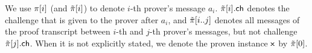  We use $\pi[i]$ (and $\tilde{\pi}[i]$) to denote $i$-th prover's
message $a_i$. $\tilde{\pi}[i].\mathsf{ch}$ denotes the challenge that is given to the prover after $a_i$, and $\tilde{\pi}[i..j]$ denotes all messages of the proof transcript 
between $i$-th and $j$-th prover's messages, but not challenge
$\tilde{\pi}[j].\mathsf{ch}$. When it is not explicitly stated, we denote the proven instance
$\mathsf{x}$ by $\tilde{\pi}[0]$. 



